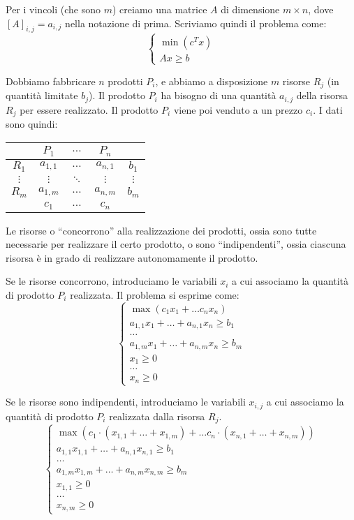 Per i vincoli (che sono $m$) creiamo una matrice $A$ di dimensione $m \times n$, dove $[A]_{i,j} = a_{i,j}$ nella notazione di prima.
Scriviamo quindi il problema come:
\[
	\begin{cases}
		\min \left( c^{T} x \right) \\
		A x \ge b
	\end{cases}
\]


Dobbiamo fabbricare $n$ prodotti $P_i$, e abbiamo a disposizione $m$ risorse $R_j$ (in quantit\`a limitate $b_j$).
Il prodotto $P_i$ ha bisogno di una quantit\`a $a_{i,j}$ della risorsa $R_j$ per essere realizzato.
Il prodotto $P_i$ viene poi venduto a un prezzo $c_i$.
I dati sono quindi:
\begin{center}
	\begin{tabular}{c|ccc|c}
		& $P_1$ & $\dots$ & $P_n$ & \\
		\hline
		$R_1$ & $a_{1,1}$ & $\dots$ & $a_{n, 1}$ & $b_1$ \\
		$\vdots$ & $\vdots$ & $\ddots$ & $\vdots$ & $\vdots$ \\
		$R_m$ & $a_{1, m}$ & $\dots$ & $a_{n, m}$ & $b_m$ \\
		\hline
		& $c_1$ & $\dots$ & $c_n$ &
	\end{tabular}
\end{center}
Le risorse o ``concorrono'' alla realizzazione dei prodotti, ossia sono tutte necessarie per realizzare il certo prodotto, o sono ``indipendenti'', ossia ciascuna risorsa \`e in grado di realizzare autonomamente il prodotto.

Se le risorse concorrono, introduciamo le variabili $x_i$ a cui associamo la quantit\`a di prodotto $P_i$ realizzata.
Il problema si esprime come:
\[
	\begin{cases}
		\max \left( c_1 x_1 + \dots c_n x_n \right) \\
		a_{1,1} x_1 + \dots + a_{n,1} x_n \ge b_1 \\
		\dots \\
		a_{1,m} x_1 + \dots + a_{n,m} x_n \ge b_m \\
		x_1 \ge 0 \\
		\dots \\
		x_n \ge 0
	\end{cases}
\]

Se le risorse sono indipendenti, introduciamo le variabili $x_{i,j}$ a cui associamo la quantit\`a di prodotto $P_i$ realizzata dalla risorsa $R_j$.
\[
	\begin{cases}
		\max \left( c_1 \cdot (x_{1,1} + \dots + x_{1,m}) + \dots c_n \cdot (x_{n,1} + \dots + x_{n,m}) \right) \\
		a_{1,1} x_{1,1} + \dots + a_{n,1} x_{n,1} \ge b_1 \\
		\dots \\
		a_{1,m} x_{1,m} + \dots + a_{n,m} x_{n,m} \ge b_m \\
		x_{1,1} \ge 0 \\
		\dots \\
		x_{n,m} \ge 0
	\end{cases}
\]

